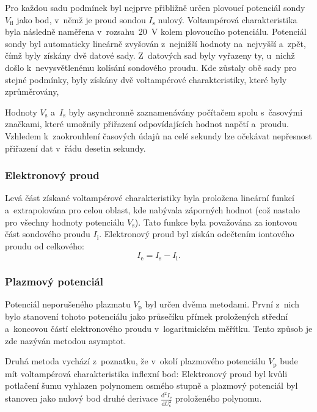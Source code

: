 \documentclass{protokol}
\newcommand\iprobe{I_\mathrm{s}}
\newcommand\iion{I_\mathrm{i}}
\newcommand\ielec{I_\mathrm{e}}
\newcommand\flpot{V_\mathrm{fl}}
\newcommand\plpot{V_\mathrm{p}}
\newcommand\potprobe{V_\mathrm{s}}
\newcommand\uprobe{U_\mathrm{s}}
\newcommand\didu{\frac{\mathrm d^2 \ielec}{\mathrm d \uprobe^2}}
\begin{document}
Pro každou sadu podmínek byl nejprve přibližně určen plovoucí potenciál sondy
$\flpot$ jako bod, v~němž je proud sondou $\iprobe$ nulový.
Voltampérová charakteristika byla následně naměřena v~rozsahu~\SI{20}{\volt}
kolem plovoucího potenciálu.
Potenciál sondy byl automaticky lineárně zvyšován z~nejnižší hodnoty
na~nejvyšší a~zpět, čímž byly získány dvě datové sady.
Z~datových sad byly vyřazeny ty, u~nichž došlo k~nevysvětlenému kolísání
sondového proudu.
Kde zůstaly obě sady pro stejné podmínky, byly získány dvě voltampérové
charakteristiky, které byly zprůměrovány,

Hodnoty $\potprobe$ a~$\iprobe$ byly asynchronně zaznamenávány počítačem
spolu s~časovými značkami, které umožnily přiřazení odpovídajících hodnot
napětí a~proudu.
Vzhledem k~zaokrouhlení časových údajů na celé sekundy lze očekávat
nepřesnost přiřazení dat v~řádu desetin sekundy.

\subsubsection{Elektronový proud}
Levá část získané voltampérové charakteristiky byla proložena lineární funkcí
a~extrapolována pro celou oblast, kde nabývala záporných hodnot
(což nastalo pro všechny hodnoty potenciálu $\potprobe$).
Tato funkce byla považována za iontovou část sondového proudu $\iion$.
Elektronový proud byl získán odečtením iontového proudu od celkového:
\begin{equation}
	\label{eq:ielec}
	\ielec = \iprobe - \iion.
\end{equation}

\subsubsection{Plazmový potenciál}
\label{sec:plpot}
Potenciál neporušeného plazmatu $\plpot$ byl určen dvěma metodami.
První z~nich bylo stanovení tohoto potenciálu jako průsečíku přímek
proložených střední a~koncovou částí elektronového proudu v~logaritmickém
měřítku.
Tento způsob je zde nazýván metodou asymptot.

Druhá metoda vychází z~poznatku, že v~okolí plazmového potenciálu $\plpot$
bude mít voltampérová charakteristika inflexní bod:
Elektronový proud byl kvůli potlačení šumu vyhlazen polynomem osmého stupně
a plazmový potenciál byl stanoven jako nulový bod druhé derivace $\didu$
proloženého polynomu.
\end{document}
